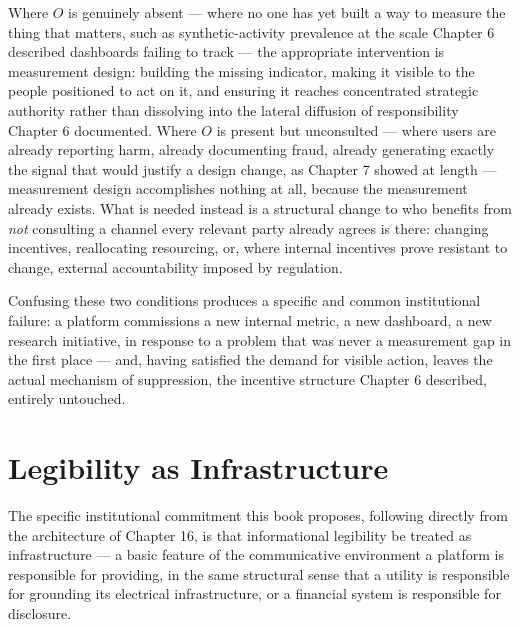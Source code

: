 \documentclass[12pt,a4paper]{book}
\begin{document}
Where $O$ is genuinely absent — where no one has yet built a way to measure the thing that matters, such as synthetic-activity prevalence at the scale Chapter 6 described dashboards failing to track — the appropriate intervention is measurement design: building the missing indicator, making it visible to the people positioned to act on it, and ensuring it reaches concentrated strategic authority rather than dissolving into the lateral diffusion of responsibility Chapter 6 documented. Where $O$ is present but unconsulted — where users are already reporting harm, already documenting fraud, already generating exactly the signal that would justify a design change, as Chapter 7 showed at length — measurement design accomplishes nothing at all, because the measurement already exists. What is needed instead is a structural change to who benefits from \emph{not} consulting a channel every relevant party already agrees is there: changing incentives, reallocating resourcing, or, where internal incentives prove resistant to change, external accountability imposed by regulation.

Confusing these two conditions produces a specific and common institutional failure: a platform commissions a new internal metric, a new dashboard, a new research initiative, in response to a problem that was never a measurement gap in the first place — and, having satisfied the demand for visible action, leaves the actual mechanism of suppression, the incentive structure Chapter 6 described, entirely untouched.

\section{Legibility as Infrastructure}

The specific institutional commitment this book proposes, following directly from the architecture of Chapter 16, is that informational legibility be treated as infrastructure — a basic feature of the communicative environment a platform is responsible for providing, in the same structural sense that a utility is responsible for grounding its electrical infrastructure, or a financial system is responsible for disclosure.
\end{document}
